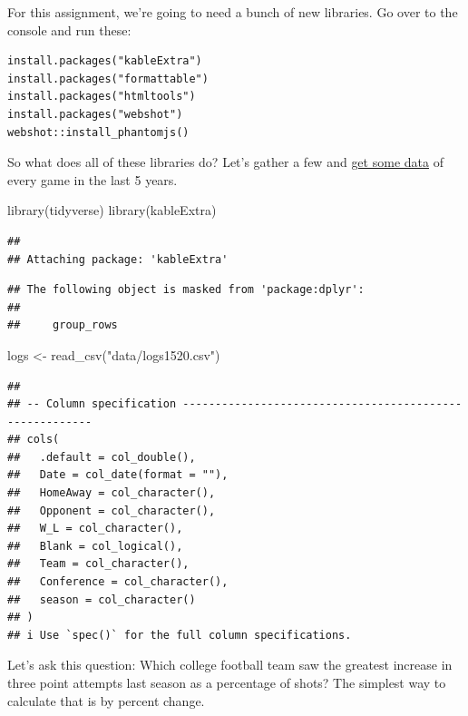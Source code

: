 \documentclass[
]{book}
\newenvironment{Shaded}{\begin{snugshade}}{\end{snugshade}}
\newcommand{\FunctionTok}[1]{\textcolor[rgb]{0.00,0.00,0.00}{#1}}
\newcommand{\NormalTok}[1]{#1}
\newcommand{\OtherTok}[1]{\textcolor[rgb]{0.56,0.35,0.01}{#1}}
\newcommand{\StringTok}[1]{\textcolor[rgb]{0.31,0.60,0.02}{#1}}
\begin{document}
For this assignment, we're going to need a bunch of new libraries. Go over to the console and run these:

\begin{verbatim}
install.packages("kableExtra")
install.packages("formattable")
install.packages("htmltools")
install.packages("webshot")
webshot::install_phantomjs()
\end{verbatim}

So what does all of these libraries do? Let's gather a few and \href{https://unl.box.com/s/th02njntiobd2azw7zhebgf9yb1o7x8i}{get some data} of every game in the last 5 years.

\begin{Shaded}
\begin{Highlighting}[]
\FunctionTok{library}\NormalTok{(tidyverse)}
\FunctionTok{library}\NormalTok{(kableExtra)}
\end{Highlighting}
\end{Shaded}

\begin{verbatim}
## 
## Attaching package: 'kableExtra'
\end{verbatim}

\begin{verbatim}
## The following object is masked from 'package:dplyr':
## 
##     group_rows
\end{verbatim}

\begin{Shaded}
\begin{Highlighting}[]
\NormalTok{logs }\OtherTok{\textless{}{-}} \FunctionTok{read\_csv}\NormalTok{(}\StringTok{"data/logs1520.csv"}\NormalTok{)}
\end{Highlighting}
\end{Shaded}

\begin{verbatim}
## 
## -- Column specification --------------------------------------------------------
## cols(
##   .default = col_double(),
##   Date = col_date(format = ""),
##   HomeAway = col_character(),
##   Opponent = col_character(),
##   W_L = col_character(),
##   Blank = col_logical(),
##   Team = col_character(),
##   Conference = col_character(),
##   season = col_character()
## )
## i Use `spec()` for the full column specifications.
\end{verbatim}

Let's ask this question: Which college football team saw the greatest increase in three point attempts last season as a percentage of shots? The simplest way to calculate that is by percent change.
\end{document}
